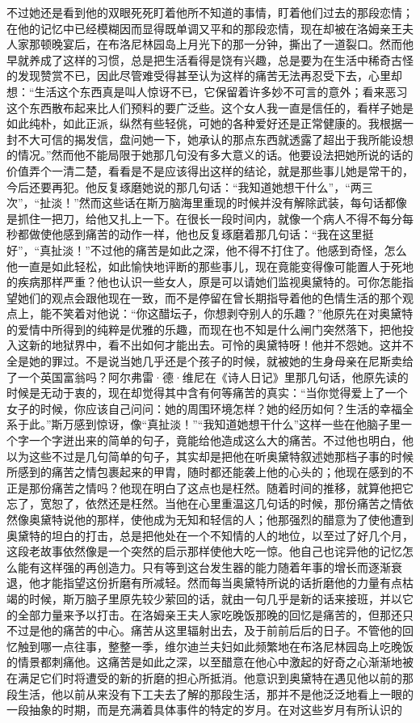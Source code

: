 \par 不过她还是看到他的双眼死死盯着他所不知道的事情，盯着他们过去的那段恋情；在他的记忆中已经模糊因而显得既单调又平和的那段恋情，现在却被在洛姆亲王夫人家那顿晚宴后，在布洛尼林园岛上月光下的那一分钟，撕出了一道裂口。然而他早就养成了这样的习惯，总是把生活看得是饶有兴趣，总是要为在生活中稀奇古怪的发现赞赏不已，因此尽管难受得甚至认为这样的痛苦无法再忍受下去，心里却想：“生活这个东西真是叫人惊讶不已，它保留着许多妙不可言的意外；看来恶习这个东西散布起来比人们预料的要广泛些。这个女人我一直是信任的，看样子她是如此纯朴，如此正派，纵然有些轻佻，可她的各种爱好还是正常健康的。我根据一封不大可信的揭发信，盘问她一下，她承认的那点东西就透露了超出于我所能设想的情况。”然而他不能局限于她那几句没有多大意义的话。他要设法把她所说的话的价值弄个一清二楚，看看是不是应该得出这样的结论，就是那些事儿她是常干的，今后还要再犯。他反复琢磨她说的那几句话：“我知道她想干什么”，“两三次”，“扯淡！”然而这些话在斯万脑海里重现的时候并没有解除武装，每句话都像是抓住一把刀，给他又扎上一下。在很长一段时间内，就像一个病人不得不每分每秒都做使他感到痛苦的动作一样，他也反复琢磨着那几句话：“我在这里挺好”，“真扯淡！”不过他的痛苦是如此之深，他不得不打住了。他感到奇怪，怎么他一直是如此轻松，如此愉快地评断的那些事儿，现在竟能变得像可能置人于死地的疾病那样严重？他也认识一些女人，原是可以请她们监视奥黛特的。可你怎能指望她们的观点会跟他现在一致，而不是停留在曾长期指导着他的色情生活的那个观点上，能不笑着对他说：“你这醋坛子，你想剥夺别人的乐趣？”他原先在对奥黛特的爱情中所得到的纯粹是优雅的乐趣，而现在也不知是什么闸门突然落下，把他投入这新的地狱界中，看不出如何才能出去。可怜的奥黛特呀！他并不怨她。这并不全是她的罪过。不是说当她几乎还是个孩子的时候，就被她的生身母亲在尼斯卖给了一个英国富翁吗？阿尔弗雷·德·维尼在《诗人日记》里那几句话，他原先读的时候是无动于衷的，现在却觉得其中含有何等痛苦的真实：“当你觉得爱上了一个女子的时候，你应该自己问问：她的周围环境怎样？她的经历如何？生活的幸福全系于此。”斯万感到惊讶，像“真扯淡！”“我知道她想干什么”这样一些在他脑子里一个字一个字迸出来的简单的句子，竟能给他造成这么大的痛苦。不过他也明白，他以为这些不过是几句简单的句子，其实却是把他在听奥黛特叙述她那档子事的时候所感到的痛苦之情包裹起来的甲胄，随时都还能袭上他的心头的；他现在感到的不正是那份痛苦之情吗？他现在明白了这点也是枉然。随着时间的推移，就算他把它忘了，宽恕了，依然还是枉然。当他在心里重温这几句话的时候，那份痛苦之情依然像奥黛特说他的那样，使他成为无知和轻信的人；他那强烈的醋意为了使他遭到奥黛特的坦白的打击，总是把他处在一个不知情的人的地位，以至过了好几个月，这段老故事依然像是一个突然的启示那样使他大吃一惊。他自己也诧异他的记忆怎么能有这样强的再创造力。只有等到这台发生器的能力随着年事的增长而逐渐衰退，他才能指望这份折磨有所减轻。然而每当奥黛特所说的话折磨他的力量有点枯竭的时候，斯万脑子里原先较少萦回的话，就由一句几乎是新的话来接班，并以它的全部力量来予以打击。在洛姆亲王夫人家吃晚饭那晚的回忆是痛苦的，但那还只不过是他的痛苦的中心。痛苦从这里辐射出去，及于前前后后的日子。不管他的回忆触到哪一点往事，整整一季，维尔迪兰夫妇如此频繁地在布洛尼林园岛上吃晚饭的情景都刺痛他。这痛苦是如此之深，以至醋意在他心中激起的好奇之心渐渐地被在满足它们时将遭受的新的折磨的担心所抵消。他意识到奥黛特在遇见他以前的那段生活，他以前从来没有下工夫去了解的那段生活，那并不是他泛泛地看上一眼的一段抽象的时期，而是充满着具体事件的特定的岁月。在对这些岁月有所认识的